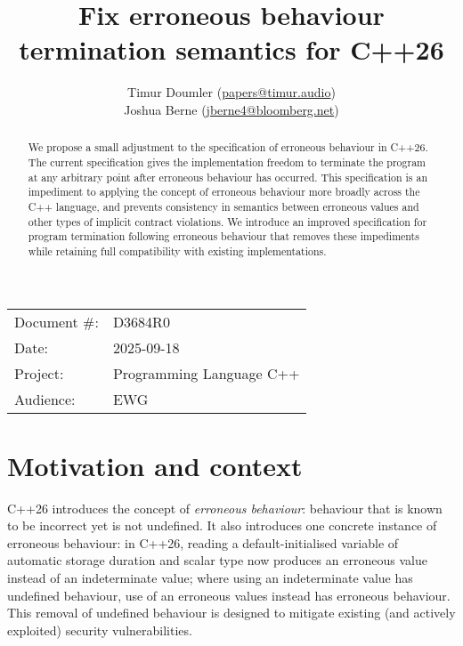 

 \usepackage[bottom]{footmisc} 



\title{Fix erroneous behaviour termination semantics for C++26}
\author{
  Timur Doumler \small(\href{mailto:papers@timur.audio}{papers@timur.audio}) \\
  Joshua Berne \small(\href{mailto:jberne4@bloomberg.net}{jberne4@bloomberg.net}) 
}
\date{}
\maketitle

\begin{tabular}{ll}
Document \#: & D3684R0 \\
Date: &2025-09-18 \\
Project: & Programming Language C++ \\
Audience: & EWG
\end{tabular}

\begin{abstract}
We propose a small adjustment to the specification of erroneous behaviour in C++26. The current specification gives the implementation  freedom to terminate the program at any arbitrary point after erroneous behaviour has occurred. This specification is an impediment to applying the concept of erroneous behaviour more broadly across the C++ language, and prevents consistency in semantics between erroneous values and other types of implicit contract violations. We introduce an improved specification for program termination following erroneous behaviour that removes these impediments while retaining full compatibility with existing implementations.
\end{abstract}


\section{Motivation and context}

C++26 introduces the concept of \emph{erroneous behaviour}: behaviour that is known to be incorrect yet is not undefined. It also introduces one concrete instance of erroneous behaviour: in C++26, reading a default-initialised variable of automatic storage duration and scalar type now produces an erroneous value instead of an indeterminate value; where using an indeterminate value has undefined behaviour, use of an erroneous values instead has erroneous behaviour. This removal of undefined behaviour is designed to mitigate existing (and actively exploited) security vulnerabilities.

